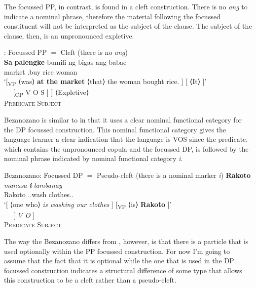 \documentclass[output=paper]{langsci/langscibook}
\begin{document}
The  focussed PP, in contrast, is found in a cleft construction.  There
is no \emph{ang} to indicate a nominal phrase, therefore the material following
the focussed constituent will not be interpreted as the subject of the clause.
The subject of the clause, then, is an unpronounced expletive.

\ea  {}: Focussed PP $=$ Cleft (there is no \emph{ang})\\
    \ea
    \gll \textbf{Sa}       \textbf{palengke}                  bumili                           ng bigas ang babae\\
    \Prep{} market  \At.buy  \Acc{} rice \Nom{} woman\\
    \glt `[\textsubscript{VP} ⟨was⟩ \textbf{at the market} ⟨that⟩ the woman bought rice. ] [ ⟨It⟩ ]' \\
    \ex
    \gll {$[$\textsubscript{VP} ⟨\Cop{⟩} PP} {~~} {[\textsubscript{CP}  V O S ] ]} ⟨Expletive⟩\\
        {\textsc{Predicate}} {} {} {\textsc{Subject}}\\
    \z
\z

Bezanozano is similar to  in that it uses a clear nominal functional
category for the DP focussed construction.  This nominal functional category
gives the language learner a clear indication that the language is VOS since
the predicate, which  contains the unpronounced copula and the focussed DP, is
followed by the nominal phrase indicated by nominal functional category
\emph{i}.

\ea Bezanozano: Focussed DP $=$ Pseudo-cleft (there is a  nominal marker  \emph{i})
    \ea
    \gll \textbf{Rakoto} \textbf{} \emph{manasa} \emph{\textbf{i}} \emph{lambanay}\\
    Rakoto \Det{} \Prs.\At{}.wash \Det{} clothes.\Fpl.\Excl{}\\
    \glt `[  ⟨one who⟩ \emph{is washing our clothes} ] [\textsubscript{VP} ⟨is⟩ \textbf{Rakoto} ]' \\
    \ex
     {~~} {[  \emph{V O} ]}\\
        {\textsc{Predicate}} {} {\textsc{Subject}}\\
    \z
\z

The way the Bezanozano differs from , however, is that there is a
particle that is used optionally within the PP focussed construction.  For now
I'm going to assume that the fact that it is optional while the one that is
used in the DP focussed construction indicates a structural difference of some
type that allows this construction to be a cleft rather than a pseudo-cleft.
\end{document}
